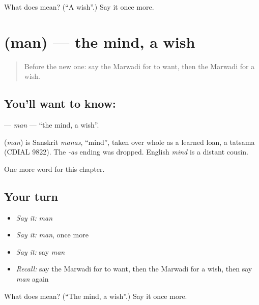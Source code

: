 \begin{tcolorbox}[breakable,colback=teal!4,colframe=teal!35!black,title={Before you move on}]
What does  mean? (\textquotedblleft{}A wish\textquotedblright{}.) Say it once more.
\end{tcolorbox}
\section[\texorpdfstring{\mw{मन} (man)}{मन (man)}]{ (man) — the mind, a wish}

\label{lesson:MW-C111-man}



\begin{quote}
Before the new one: say the Marwadi for to want, then the Marwadi for a wish.
\end{quote}

\subsection*{You'll want to know: }
\textbf{} — \emph{man} — \textquotedblleft{}the mind, a wish\textquotedblright{}.

\begin{cousinweb}
\textbf{} (\emph{man}) is Sanskrit \emph{manas}, \textquotedblleft{}mind\textquotedblright{}, taken over whole as a learned loan, a tatsama (CDIAL 9822). The \emph{-as} ending was dropped. English \emph{mind} is a distant cousin.
\end{cousinweb}

\begin{grammarlens}[title={What you've built}]
One more word for this chapter.
\end{grammarlens}

\subsection*{Your turn}
\begin{itemize}
\raggedright
  \item \emph{Say it:} \emph{man}
  \item \emph{Say it:} \emph{man}, once more
  \item \emph{Say it:} say \emph{man}
  \item \emph{Recall:} say the Marwadi for to want, then the Marwadi for a wish, then say \emph{man} again
\end{itemize}

\begin{tcolorbox}[breakable,colback=teal!4,colframe=teal!35!black,title={Before you move on}]
What does  mean? (\textquotedblleft{}The mind, a wish\textquotedblright{}.) Say it once more.
\end{tcolorbox}
